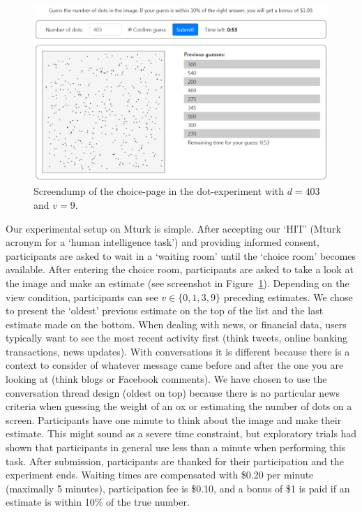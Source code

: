 \documentclass[9pt,a4paper,twocolumn,lineno]{article}
\begin{document}
\begin{figure}[!b]
\centering
\includegraphics[width=.8\textwidth]{../Screenshots/FigS1.png}
\caption{Screendump of the choice-page in the dot-experiment with $d=403$ and $v=9$.}
\label{fig:S1}
\end{figure}

Our experimental setup on Mturk is simple. After accepting our ‘HIT’ (Mturk acronym for a ‘human intelligence task’) and providing informed consent, participants are asked to wait in a ‘waiting room’ until the ‘choice room’ becomes available. After entering the choice room, participants are asked to take a look at the image and make an estimate (see screenshot in Figure~\ref{fig:S1}). Depending on the view condition, participants can see $v\in\{0,1,3,9\}$ preceding estimates. We chose to present the ‘oldest’ previous estimate on the top of the list and the last estimate made on the bottom. When dealing with news, or financial data, users typically want to see the most recent activity first (think tweets, online banking transactions, news updates). With conversations it is different because there is a context to consider of whatever message came before and after the one you are looking at (think blogs or Facebook comments). We have chosen to use the conversation thread design (oldest on top) because there is no particular news criteria when guessing the weight of an ox or estimating the number of dots on a screen. Participants have one minute to think about the image and make their estimate. This might sound as a severe time constraint, but exploratory trials had shown that participants in general use less than a minute when performing this task. After submission, participants are thanked for their participation and the experiment ends. Waiting times are compensated with \$0.20 per minute (maximally 5 minutes), participation fee is \$0.10, and a bonus of \$1 is paid if an estimate is within 10\% of the true number.
\end{document}
